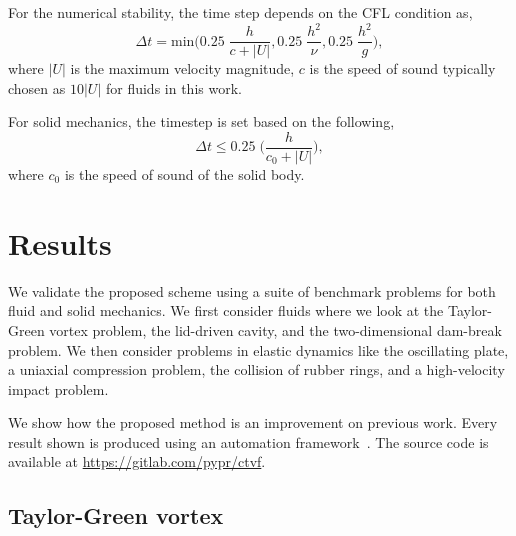 \documentclass[preprint,12pt]{elsarticle}
\begin{document}
For the numerical stability, the time step depends on the CFL condition as,
\begin{equation}
  \label{eq:time-step-cfl}
  \Delta t = \mathrm{min} \bigg( 0.25 \; \frac{h}{c + |U|} ,  0.25 \; \frac{h^2}{\nu},  0.25 \; \frac{h^2}{g} \bigg),
\end{equation}
where $|U|$ is the maximum velocity magnitude, $c$ is the speed of sound
typically chosen as $10 |U|$ for fluids in this work.

%
For solid mechanics, the timestep is set based on the following,
\begin{equation}
  \label{eq:time-step-body-force}
  \Delta t \leq 0.25 \; \bigg(\frac{h}{c_0 + |U|} \bigg),
\end{equation}
where $c_0$ is the speed of sound of the solid body.

\section{Results}
\label{sec:results}

We validate the proposed scheme using a suite of benchmark problems for both
fluid and solid mechanics. We first consider fluids where we look at the
Taylor-Green vortex problem, the lid-driven cavity,
and the two-dimensional dam-break problem. We then consider
problems in elastic dynamics like the oscillating plate, a uniaxial
compression problem, the collision of rubber rings, and a high-velocity impact
problem.

We show how the proposed method is an improvement on previous work. Every
result shown is produced using an automation framework~\cite{pr:automan:2018}.
The source code is available at \url{https://gitlab.com/pypr/ctvf}.

\FloatBarrier%

\subsection{Taylor-Green vortex}
\label{sec:tgv}
\end{document}
